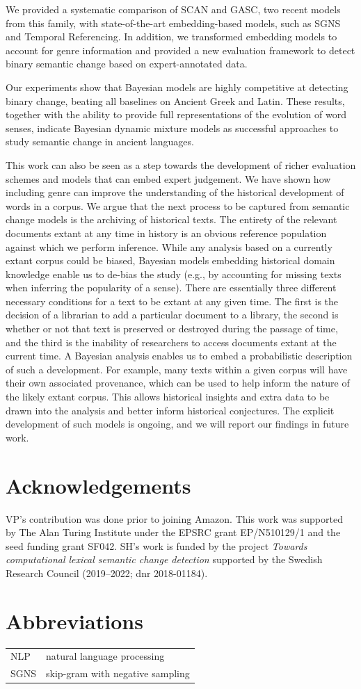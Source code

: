 \documentclass[output=paper%
]{langscibook}
\begin{document}
We provided a systematic comparison of SCAN and GASC, two recent models from this family, with state-of-the-art embedding-based models, such as SGNS and Temporal Referencing. In addition, we transformed embedding models to account for genre information and provided a new evaluation framework to detect binary semantic change based on expert-annotated data. 

Our experiments show that Bayesian models are highly competitive at detecting binary change, beating all baselines on Ancient Greek and Latin. These results, together with the ability to provide full representations of the evolution of word senses, indicate Bayesian dynamic mixture models as successful approaches to study semantic change in ancient languages.



This work can also be seen as a step towards the development of richer evaluation schemes and models that can embed expert judgement. We have shown how including genre can improve the understanding of the historical development of words in a corpus. 
We argue that the next process to be captured from semantic change models is the archiving of historical texts. The entirety of the relevant documents extant at any time in history is an obvious reference population against which we perform inference. While any analysis based on a currently extant corpus could be biased, Bayesian models embedding historical domain knowledge enable us to de-bias the study (e.g., by accounting for missing texts when inferring the popularity of a sense).
There are essentially three different necessary conditions for a text to be extant at any given time. The first is the decision of a librarian to add a particular document to a library, the second is whether or not that text is preserved or destroyed during the passage of time, and the third is the inability of researchers to access documents extant at the current time. A Bayesian analysis enables us to embed a probabilistic description of such a development. For example, many texts within a given corpus will have their own associated provenance, which can be used to help inform the nature of the likely extant corpus. This allows historical insights and extra data to be drawn into the analysis and better inform historical conjectures.  The explicit development of such models is ongoing, and we will report our findings in future work.


\section*{Acknowledgements}
VP's contribution was done prior to joining Amazon.
This work was supported by The Alan Turing Institute under the EPSRC grant EP/N510129/1 and the seed funding grant SF042. 
SH's work is funded by the project \textit{Towards computational lexical semantic change detection} supported  by the Swedish Research Council (2019--2022; dnr 2018-01184).

\section*{Abbreviations}
\begin{tabularx}{\textwidth}{@{}lQ@{}}
NLP & natural language processing \\
SGNS & skip-gram with negative sampling
\end{tabularx}

{\sloppy\printbibliography[heading=subbibliography,notkeyword=this]}
\end{document}
